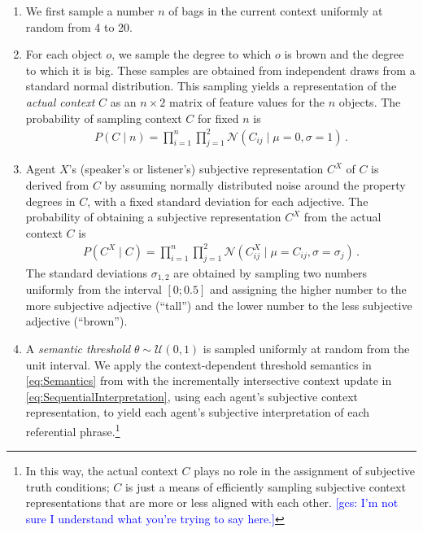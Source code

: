 \documentclass[10pt,a4paper]{article}
\newcommand{\sem}[1]{\mbox{$[\![$#1$]\!]$}}
\newcommand{\gcs}[1]{\textcolor{blue}{[gcs: #1]}}
\begin{document}
\begin{enumerate}
\setlength{\itemsep}{0pt}

\item We first sample a number $n$ of bags in the current context uniformly at
  random from 4 to 20.

\item For each object $o$, we sample the degree to which $o$ is brown and the
  degree to which it is big. These samples are obtained from independent draws
  from a standard normal distribution. This sampling yields a representation of
  the \emph{actual context} $C$ as an $n \times 2$ matrix of feature values for
  the $n$ objects. The probability of sampling context $C$ for fixed $n$ is
  \begin{align*}
    P(C \mid n) = \prod_{i=1}^n \prod_{j=1}^2 \mathcal{N}(C_{ij} \mid \mu = 0, \sigma = 1)\,.
  \end{align*}

\item Agent $X$'s (speaker's or listener's) subjective representation $C^X$ of
  $C$ is derived from $C$ by assuming normally distributed noise around the
  property degrees in $C$, with a fixed standard deviation for each adjective.
  The probability of obtaining a subjective representation $C^X$ from the actual
  context $C$ is
  \begin{align*}
    P(C^X \mid C) = \prod_{i=1}^n \prod_{j=1}^2 \mathcal{N}(C_{ij}^X \mid \mu = C_{ij}, \sigma = \sigma_j)\,.
  \end{align*}
  The standard deviations $\sigma_{1,2}$ are obtained by sampling two numbers
  uniformly from the interval $[0;0.5]$ and assigning the higher number to the
  more subjective adjective (``tall'') and the lower number to the less subjective
  adjective (``brown'').

\item A \emph{semantic threshold} $\theta \sim \mathcal{U}(0,1)$ is sampled
  uniformly at random from the unit interval. We apply the context-dependent
  threshold semantics in \eqref{eq:Semantics} from  with
  the incrementally intersective context update in
  \eqref{eq:SequentialInterpretation}, using each agent's subjective context
  representation, to yield each agent's subjective interpretation of each
  referential phrase.\footnote{In this way, the actual context $C$ plays no role
    in the assignment of subjective truth conditions; $C$ is just a means of
    efficiently sampling subjective context representations that are more or
    less aligned with each other. \gcs{I'm not sure I understand what you're trying to say here.}}
 

\end{enumerate}
\end{document}
